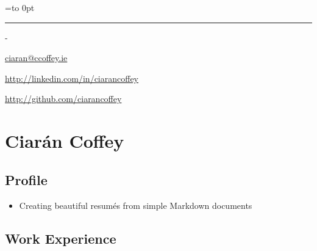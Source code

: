 \documentclass[]{article}
\date{}
\newenvironment{nospace}
  {\par\edef\theprevdepth{\the\prevdepth}\nointerlineskip
   \setbox\zerobox=\vtop to 0pt\bgroup
   \hrule height0pt\kern\dimexpr\baselineskip-\topskip\relax
  }
  {\par\vss\egroup\ht\zerobox=0pt \wd\zerobox=0pt \dp\zerobox=0pt
   \box\zerobox}
\begin{document}
\begin{nospace}\begin{flushright}
\vspace{-2em}\href{mailto:ciaran@ccoffey.ie}{ciaran@ccoffey.ie}

\url{http://linkedin.com/in/ciarancoffey}

\url{http://github.com/ciarancoffey}
\end{flushright}\end{nospace}

\section{Ciarán Coffey}\label{ciaruxe1n-coffey}

\subsection{Profile}\label{profile}

\begin{itemize}
\itemsep1pt\parskip0pt
\item
  Creating beautiful resumés from simple Markdown documents
\end{itemize}

\subsection{Work Experience}\label{work-experience}
\end{document}
